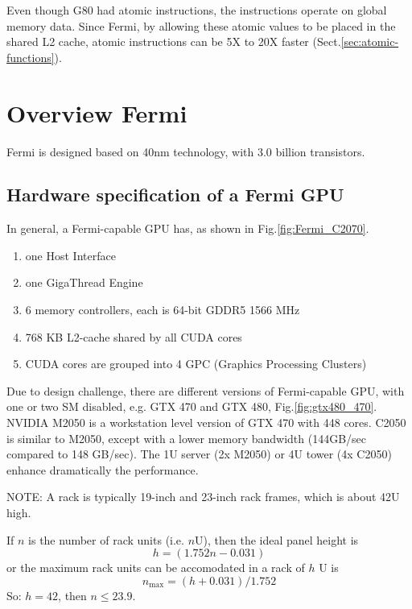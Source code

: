 Even though G80 had atomic instructions, the instructions operate on global
memory data. Since Fermi, by allowing these atomic values to be placed in the
shared L2 cache, atomic instructions can be 5X to 20X faster
(Sect.\ref{sec:atomic-functions}).


\section{Overview Fermi}
\label{sec:fermi_overview}

Fermi is designed based on 40nm technology, with 3.0 billion transistors. 

\subsection{Hardware specification of a Fermi GPU}
\label{sec:hardware-information}

In general, a Fermi-capable GPU has, as shown in Fig.\ref{fig:Fermi_C2070}.
\begin{enumerate}
  \item one Host Interface
  \item one GigaThread Engine
  \item 6 memory controllers, each is 64-bit GDDR5 1566 MHz
  \item 768 KB L2-cache shared by all CUDA cores
  \item CUDA cores are grouped into 4 GPC (Graphics Processing Clusters)
\end{enumerate}
Due to design challenge, there are different versions of Fermi-capable GPU, with
one or two SM disabled, e.g. GTX 470 and GTX 480, Fig.\ref{fig:gtx480_470}.
NVIDIA M2050 is a workstation level version of GTX 470 with 448
cores. C2050 is similar to M2050, except with a lower memory bandwidth
(144GB/sec compared to 148 GB/sec). The 1U server (2x M2050) or 4U
tower (4x C2050) enhance dramatically the performance.  

NOTE: A rack is typically 19-inch and 23-inch rack frames, which is about 42U high.

If $n$ is the number of rack units (i.e. $n$U), then the ideal panel height is 
\begin{equation}
h = (1.752n - 0.031)
\end{equation}
or the maximum rack units can be accomodated in a rack of $h$ U is
\begin{equation}
n_{\max} = (h + 0.031)/1.752
\end{equation}
So: $h = 42$, then $n \le 23.9$.

